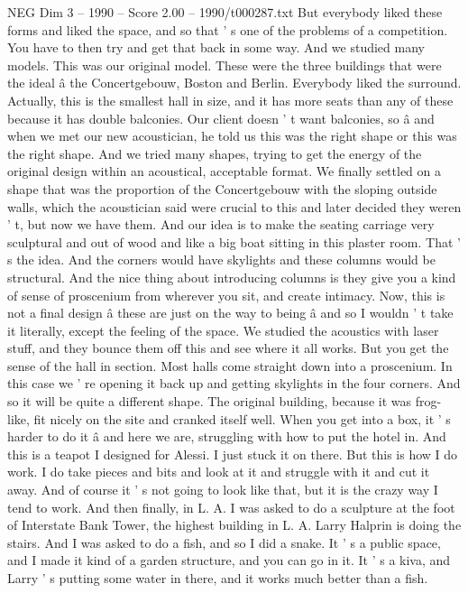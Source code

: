 \begin{textsample}{NEG Dim 3 – 1990 – Score 2.00 – 1990/t000287.txt}
But everybody liked these forms and liked the space, and so that ' s one of the problems of a competition.
You have to then try and get that back in some way.
And we studied many models.
This was our original model.
These were the three buildings that were the ideal â the Concertgebouw, Boston and Berlin.
Everybody liked the surround.
Actually, this is the smallest hall in size, and it has more seats than any of these because it has double balconies.
Our client doesn ' t want balconies, so â and when we met our new acoustician, he told us this was the right shape or this was the right shape.
And we tried many shapes, trying to get the energy of the original design within an acoustical, acceptable format.
We finally settled on a shape that was the proportion of the Concertgebouw with the sloping outside walls, which the acoustician said were crucial to this and later decided they weren ' t, but now we have them.
And our idea is to make the seating carriage very sculptural and out of wood and like a big boat sitting in this plaster room.
That ' s the idea.
And the corners would have skylights and these columns would be structural.
And the nice thing about introducing columns is they give you a kind of sense of proscenium from wherever you sit, and create intimacy.
Now, this is not a final design â these are just on the way to being â and so I wouldn ' t take it literally, except the feeling of the space.
We studied the acoustics with laser stuff, and they bounce them off this and see where it all works.
But you get the sense of the hall in section.
Most halls come straight down into a proscenium.
In this case we ' re opening it back up and getting skylights in the four corners.
And so it will be quite a different shape.
The original building, because it was frog-like, fit nicely on the site and cranked itself well.
When you get into a box, it ' s harder to do it â and here we are, struggling with how to put the hotel in.
And this is a teapot I designed for Alessi.
I just stuck it on there.
But this is how I do work.
I do take pieces and bits and look at it and struggle with it and cut it away.
And of course it ' s not going to look like that, but it is the crazy way I tend to work.
And then finally, in L.
A.
I was asked to do a sculpture at the foot of Interstate Bank Tower, the highest building in L.
A.
Larry Halprin is doing the stairs.
And I was asked to do a fish, and so I did a snake.
It ' s a public space, and I made it kind of a garden structure, and you can go in it.
It ' s a kiva, and Larry ' s putting some water in there, and it works much better than a fish.

\end{textsample}
